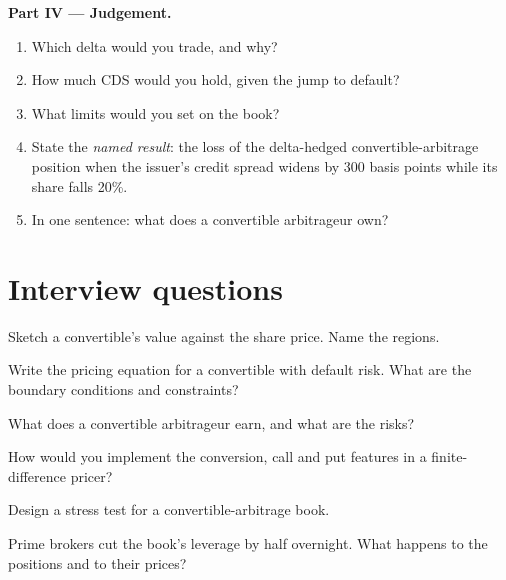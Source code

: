 \begin{problem}
\medskip\noindent\textbf{Part IV --- Judgement.}
\begin{enumerate}[resume]
\item Which delta would you trade, and why?
\item How much CDS would you hold, given the jump to default?
\item What limits would you set on the book?
\item State the \emph{named result}: the loss of the delta-hedged convertible-arbitrage position when the issuer's credit spread widens by 300 basis
points while its share falls 20\%.
\item In one sentence: what does a convertible arbitrageur own?
\end{enumerate}
\end{problem}

\section{Interview questions}

\begin{interviewq}\label{iq:dv:convertibles-and-the-credit-equity-link:1}
Sketch a convertible's value against the share price. Name the regions.
\end{interviewq}

\begin{interviewq}\label{iq:dv:convertibles-and-the-credit-equity-link:2}
Write the pricing equation for a convertible with default risk. What are the boundary conditions and constraints?
\end{interviewq}

\begin{interviewq}\label{iq:dv:convertibles-and-the-credit-equity-link:3}
What does a convertible arbitrageur earn, and what are the risks?
\end{interviewq}

\begin{interviewq}\label{iq:dv:convertibles-and-the-credit-equity-link:4}
How would you implement the conversion, call and put features in a finite-difference pricer?
\end{interviewq}

\begin{interviewq}\label{iq:dv:convertibles-and-the-credit-equity-link:5}
Design a stress test for a convertible-arbitrage book.
\end{interviewq}

\begin{interviewq}\label{iq:dv:convertibles-and-the-credit-equity-link:6}
Prime brokers cut the book's leverage by half overnight. What happens to the positions and to their prices?
\end{interviewq}
